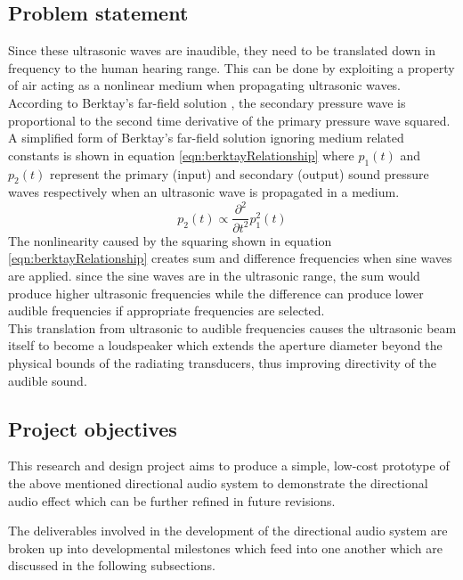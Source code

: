 \subsection{Problem statement}
Since these ultrasonic waves are inaudible, they need to be translated down in frequency to the human hearing range. This can be done by exploiting a property of air acting as a nonlinear medium when propagating ultrasonic waves. According to Berktay's far-field solution \cite{berktay_1965}, the secondary pressure wave is proportional to the second time derivative of the primary pressure wave squared. A simplified form of Berktay's far-field solution ignoring medium related constants is shown in equation \ref{eqn:berktayRelationship} where $p_1 (t)$ and $p_2 (t)$ represent the primary (input) and secondary (output) sound pressure waves respectively when an ultrasonic wave is propagated in a medium.
\begin{equation}
    p_2(t) \propto \frac{\partial^2}{\partial t^2}p_1^2(t)
    \label{eqn:berktayRelationship}
\end{equation}
The nonlinearity caused by the squaring shown in equation \ref{eqn:berktayRelationship} creates sum and difference frequencies when sine waves are applied. since the sine waves are in the ultrasonic range, the sum would produce higher ultrasonic frequencies while the difference can produce lower audible frequencies if appropriate frequencies are selected.\\
This translation from ultrasonic to audible frequencies causes the ultrasonic beam itself to become a loudspeaker which extends the aperture diameter beyond the physical bounds of the radiating transducers, thus improving directivity of the audible sound.
\subsection{Project objectives}
This research and design project aims to produce a simple, low-cost prototype of the above mentioned directional audio system to demonstrate the directional audio effect which can be further refined in future revisions.

The deliverables involved in the development of the directional audio system are broken up into developmental milestones which feed into one another which are discussed in the following subsections.
